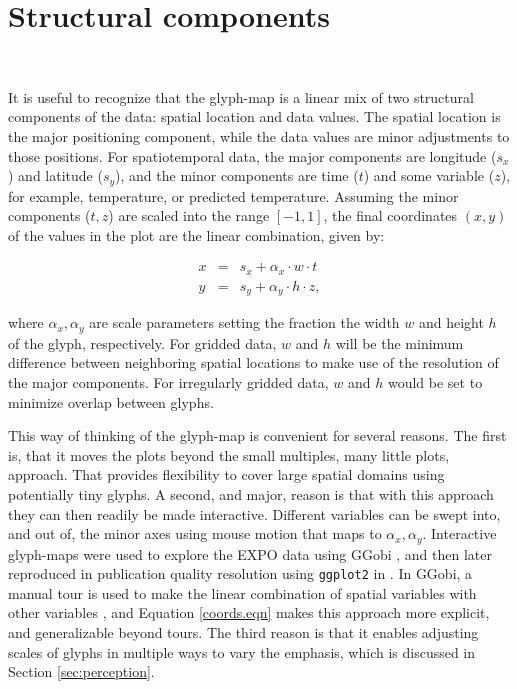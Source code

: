\documentclass[oneside]{article}
\begin{document}
\section{Structural components}~\label{sec:construction}

It is useful to recognize that the glyph-map is a linear mix of two structural components of the data: spatial location and data values. The spatial location is the major positioning component, while the data values are minor adjustments to those positions. For spatiotemporal data, the major components are longitude ($s_x$) and latitude ($s_y$), and the minor components are time ($t$) and some variable ($z$), for example, temperature, or predicted temperature. Assuming the minor components ($t, z$) are scaled into the range $[-1, 1]$, the final coordinates $(x,y)$ of the values in the plot are the linear combination, given by:

\begin{equation}
  \begin{array}{lll}
  x &=& s_x + \alpha_x \cdot w \cdot t\\
  y &=& s_y + \alpha_y \cdot h \cdot z, 
  \end{array}
  \label{coords.eqn}
\end{equation}

\noindent where $\alpha_x, \alpha_y$ are scale parameters setting the fraction the width $w$ and height $h$ of the glyph, respectively. For gridded data, $w$ and $h$ will be the minimum difference between neighboring spatial locations to make use of the resolution of the major components. For irregularly gridded data, $w$ and $h$ would be set to minimize overlap between glyphs.

This way of thinking of the glyph-map is convenient for several reasons. The first is, that it moves the plots beyond the small multiples, many little plots, approach. That provides flexibility to cover large spatial domains using potentially tiny glyphs. A second, and major, reason is that with this approach they can then readily be made interactive. Different variables can be swept into, and out of, the minor axes using mouse motion that maps to $\alpha_x, \alpha_y$. Interactive glyph-maps were used to explore the EXPO data using  GGobi \citep{swayne:2003}, and then later reproduced in publication quality resolution using {\tt ggplot2} \citep{me:ggplot2} in \citet{hobbs:2010}. In GGobi, a manual tour is used to make the linear combination of spatial variables with other variables \citep{CB95}, and Equation \ref{coords.eqn} makes this approach more explicit, and generalizable beyond tours. The third reason is that it enables adjusting scales of glyphs in multiple ways to vary the emphasis, which is discussed in Section \ref{sec:perception}.
\end{document}
